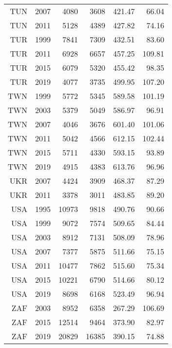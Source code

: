 \begin{longtable}{|r|r|r|r|r|r|}
    TUN   & 2007  & 4080  & 3608  & 421.47 & 66.04 \\
    TUN   & 2011  & 5128  & 4389  & 427.82 & 74.16 \\
    TUR   & 1999  & 7841  & 7309  & 432.51 & 83.60 \\
    TUR   & 2011  & 6928  & 6657  & 457.25 & 109.81 \\
    TUR   & 2015  & 6079  & 5320  & 455.42 & 98.35 \\
    TUR   & 2019  & 4077  & 3735  & 499.95 & 107.20 \\
    TWN   & 1999  & 5772  & 5345  & 589.58 & 101.19 \\
    TWN   & 2003  & 5379  & 5049  & 586.97 & 96.91 \\
    TWN   & 2007  & 4046  & 3676  & 601.40 & 101.06 \\
    TWN   & 2011  & 5042  & 4566  & 612.15 & 102.44 \\
    TWN   & 2015  & 5711  & 4330  & 593.15 & 93.89 \\
    TWN   & 2019  & 4915  & 4383  & 613.76 & 96.96 \\
    UKR   & 2007  & 4424  & 3909  & 468.37 & 87.29 \\
    UKR   & 2011  & 3378  & 3011  & 483.85 & 89.20 \\
    USA   & 1995  & 10973 & 9818  & 490.76 & 90.66 \\
    USA   & 1999  & 9072  & 7574  & 509.65 & 84.44 \\
    USA   & 2003  & 8912  & 7131  & 508.09 & 78.96 \\
    USA   & 2007  & 7377  & 5875  & 511.66 & 75.15 \\
    USA   & 2011  & 10477 & 7862  & 515.60 & 75.34 \\
    USA   & 2015  & 10221 & 6790  & 514.66 & 80.12 \\
    USA   & 2019  & 8698  & 6168  & 523.49 & 96.94 \\
    ZAF   & 2003  & 8952  & 6358  & 267.29 & 106.69 \\
    ZAF   & 2015  & 12514 & 9464  & 373.90 & 82.97 \\
    ZAF   & 2019  & 20829 & 16385 & 390.15 & 74.88 \\
\end{longtable}%